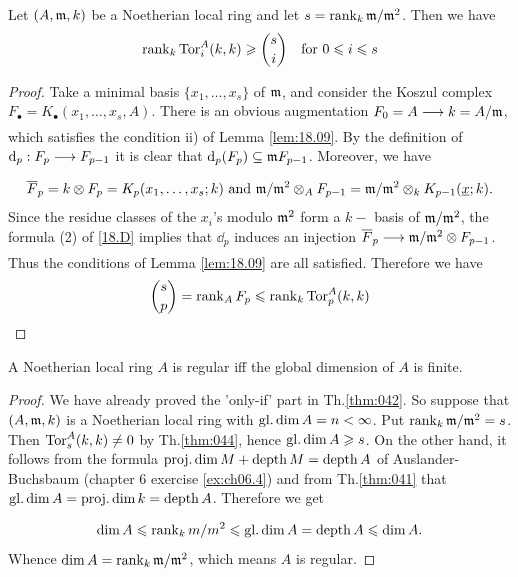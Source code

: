 \documentclass[../main]{subfiles}
\begin{document}
\begin{partheorem}\label{thm:044} Let $(A, \mathfrak{m}, k)$ be a Noetherian local ring and let \newline $s=\operatorname{rank}_{k} \mathfrak{m}/\mathfrak{m}^2$. Then we have
\[
\operatorname{rank}_k \operatorname{Tor}_i^A(k,k)\geqslant \binom{s}{i} \quad \text{for } 0\leqslant i \leqslant s
\]
\end{partheorem}
\begin{proof}
Take a minimal basis $\{x_{1}, \dots, x_{s}\}$ of $\mathfrak{m}$, and consider the Koszul complex $F_\bullet=K_\bullet(x_{1}, \dots, x_{s}, A)$. There is an obvious augmentation $F_{0}=A \varrightarrow{} k=A / \ideal{m}$, which satisfies the condition ii) of Lemma \ref{lem:18.09}. By the definition of\newline  $\dd_{p}: F_{p} \varrightarrow{} F_{p-1}$ it is clear that $\mathrm{d}_{p}(F_{p}) \subseteq \mathfrak{m}F_{p-1}$. Moreover, we have \[\overline{F}_{p}=k \otimes F_{p}= K_p(x_1,\dots ,x_s; k)\text{ and } \mathfrak{m}/\mathfrak{m}^2 \otimes_A F_{p-1} =\mathfrak{m}/\mathfrak{m}^2\otimes_k K_{p-1}(\underline{x};k).\]
Since the residue classes of the $x_{i}$'s modulo $\mathfrak{m}^{2}$ form a $k-$ basis of $\mathfrak{m} / \mathfrak{m}^{2}$, the formula (2) of \ref{18.D} implies that $\dd_{p}$ induces an injection $\overline{F}_{p} \varrightarrow{} \ideal{m} / \ideal{m}^{2} \otimes F_{p-1}$. Thus the conditions of Lemma \ref{lem:18.09} are all satisfied. Therefore we have
\[\binom{s}{p} = \operatorname{rank}_A F_p \leqslant \operatorname{rank}_k \operatorname{Tor}_p^A(k,k)\]
\end{proof}
\begin{partheorem}\label{thm:045}
A Noetherian local ring $A$ is regular iff the global dimension of $A$ is finite.
\end{partheorem}
\begin{proof}
We have already proved the 'only-if' part in Th.\ref{thm:042}. So suppose that $(A, \mathfrak{m}, k)$ is a Noetherian local ring with $\operatorname{gl. dim} A=n<\infty$. Put $\operatorname{rank}_{k} \mathfrak{m}/ \mathfrak{m}^{2}=s$. Then $\operatorname{Tor}_{s}^{A}(k, k) \neq 0$ by Th.\ref{thm:044}, hence  $\operatorname{gl. dim} A \geqslant s$. On the other hand, it follows from the formula $\operatorname{proj. dim} M +\operatorname{depth} M = \operatorname{depth} A $ of Auslander-Buchsbaum (chapter 6 exercise \ref{ex:ch06.4}) and from Th.\ref{thm:041} that $\operatorname{gl. dim} A = \operatorname{proj. dim} k = \operatorname{depth} A $. Therefore we get

\[\operatorname{dim} A \leqslant \operatorname{rank}_{k} m / m^{2} \leqslant \operatorname{gl. dim} A=\operatorname{depth} A \leqslant \operatorname{dim} A .\] Whence $\operatorname{dim} A=\operatorname{rank}_{k} \mathfrak{m} / \mathfrak{m}^{2}$, which means $A$ is regular.\end{proof}
\end{document}
